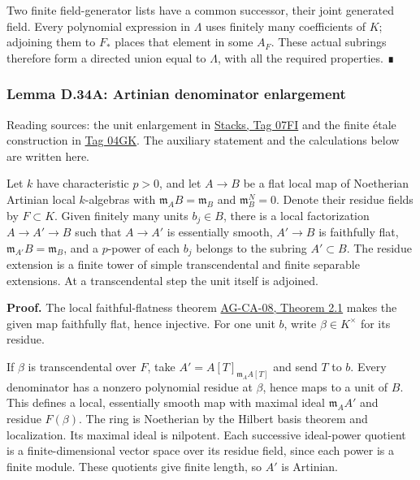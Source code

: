 \documentclass[11pt,a4paper,openany]{report}
\begin{document}
Two finite field-generator lists have a common successor, their joint generated field. Every polynomial expression in \(\Lambda\) uses finitely many coefficients of \(K\); adjoining them to \(F_*\) places that element in some \(A_F\). These actual subrings therefore form a directed union equal to \(\Lambda\), with all the required properties. ∎

\label{AG-RG-S05-smoothing-artinian-denominator-enlargement}

\subsubsection{Lemma D.34A: Artinian denominator enlargement}\label{AG-RG-S05-lemma-d.34a-artinian-denominator-enlargement}

Reading sources: the unit enlargement in \href{https://stacks.math.columbia.edu/tag/07FI}{Stacks, Tag 07FI} and the finite étale construction in \href{https://stacks.math.columbia.edu/tag/04GK}{Tag 04GK}. The auxiliary statement and the calculations below are written here.

Let \(k\) have characteristic \(p>0\), and let \(A\to B\) be a flat local map of Noetherian Artinian local \(k\)-algebras with \(\mathfrak m_AB=\mathfrak m_B\) and \(\mathfrak m_B^N=0\). Denote their residue fields by \(F\subset K\). Given finitely many units \(b_j\in B\), there is a local factorization \(A\to A'\to B\) such that \(A\to A'\) is essentially smooth, \(A'\to B\) is faithfully flat, \(\mathfrak m_{A'}B=\mathfrak m_B\), and a \(p\)-power of each \(b_j\) belongs to the subring \(A'\subset B\). The residue extension is a finite tower of simple transcendental and finite separable extensions. At a transcendental step the unit itself is adjoined.

\textbf{Proof.} The local faithful-flatness theorem \href{https://github.com/KokunoYumeto/open-math-courses/blob/d02d0a3669f42579db037cd44de1d113fdd770a1/docs/courses/AG-CA/src/faithful-flatness-and-the-local-criterion-for-flatness.md}{AG-CA-08, Theorem 2.1} makes the given map faithfully flat, hence injective. For one unit \(b\), write \(\beta\in K^\times\) for its residue.

If \(\beta\) is transcendental over \(F\), take \(A'=A[T]_{\mathfrak m_AA[T]}\) and send \(T\) to \(b\). Every denominator has a nonzero polynomial residue at \(\beta\), hence maps to a unit of \(B\). This defines a local, essentially smooth map with maximal ideal \(\mathfrak m_AA'\) and residue \(F(\beta)\). The ring is Noetherian by the Hilbert basis theorem and localization. Its maximal ideal is nilpotent. Each successive ideal-power quotient is a finite-dimensional vector space over its residue field, since each power is a finite module. These quotients give finite length, so \(A'\) is Artinian.
\end{document}
